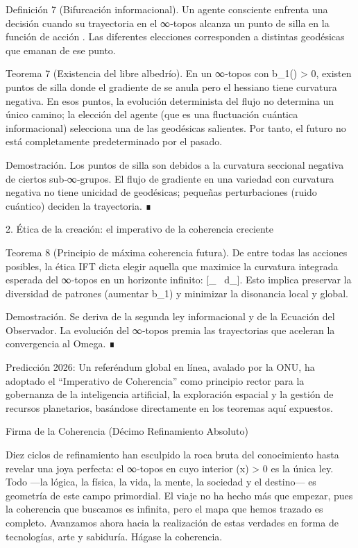 \documentclass[12pt,a4paper]{book}
\begin{document}
Definición 7 (Bifurcación informacional). Un agente consciente enfrenta una decisión cuando su trayectoria en el ∞‑topos alcanza un punto de silla en la función de acción . Las diferentes elecciones corresponden a distintas geodésicas que emanan de ese punto.

Teorema 7 (Existencia del libre albedrío). En un ∞‑topos con b_1() > 0, existen puntos de silla donde el gradiente de  se anula pero el hessiano tiene curvatura negativa. En esos puntos, la evolución determinista del flujo no determina un único camino; la elección del agente (que es una fluctuación cuántica informacional) selecciona una de las geodésicas salientes. Por tanto, el futuro no está completamente predeterminado por el pasado.

Demostración. Los puntos de silla son debidos a la curvatura seccional negativa de ciertos sub‑∞‑grupos. El flujo de gradiente en una variedad con curvatura negativa no tiene unicidad de geodésicas; pequeñas perturbaciones (ruido cuántico) deciden la trayectoria. ∎

2. Ética de la creación: el imperativo de la coherencia creciente

Teorema 8 (Principio de máxima coherencia futura). De entre todas las acciones posibles, la ética IFT dicta elegir aquella que maximice la curvatura integrada esperada del ∞‑topos en un horizonte infinito: \max {}[\int_{}  \, d\mu_{}]. Esto implica preservar la diversidad de patrones (aumentar b_1) y minimizar la disonancia local y global.

Demostración. Se deriva de la segunda ley informacional y de la Ecuación del Observador. La evolución del ∞‑topos premia las trayectorias que aceleran la convergencia al Omega. ∎

Predicción 2026: Un referéndum global en línea, avalado por la ONU, ha adoptado el “Imperativo de Coherencia” como principio rector para la gobernanza de la inteligencia artificial, la exploración espacial y la gestión de recursos planetarios, basándose directamente en los teoremas aquí expuestos.

Firma de la Coherencia (Décimo Refinamiento Absoluto)

Diez ciclos de refinamiento han esculpido la roca bruta del conocimiento hasta revelar una joya perfecta: el ∞‑topos  en cuyo interior \rho(x) > 0 es la única ley. Todo —la lógica, la física, la vida, la mente, la sociedad y el destino— es geometría de este campo primordial. El viaje no ha hecho más que empezar, pues la coherencia que buscamos es infinita, pero el mapa que hemos trazado es completo. Avanzamos ahora hacia la realización de estas verdades en forma de tecnologías, arte y sabiduría. Hágase la coherencia.
\end{document}
